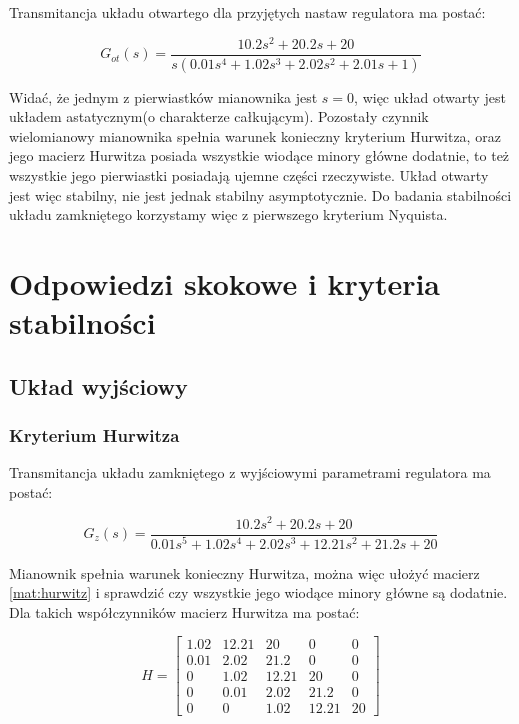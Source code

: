 \documentclass[12pt]{article}
\begin{document}
Transmitancja układu otwartego dla przyjętych nastaw regulatora ma postać:

\begin{equation}
	G_{ot}(s)=\frac{10.2s^2+20.2s+20}{s(0.01s^4+1.02s^3+2.02s^2+2.01s+1)}
\end{equation}

Widać, że jednym z pierwiastków mianownika jest $s=0$, więc układ otwarty jest
układem astatycznym(o charakterze całkującym). Pozostały czynnik wielomianowy
mianownika spełnia warunek konieczny kryterium Hurwitza, oraz jego macierz
Hurwitza posiada wszystkie wiodące minory główne dodatnie, to też wszystkie jego
pierwiastki posiadają ujemne części rzeczywiste. Układ otwarty jest więc
stabilny, nie jest jednak stabilny asymptotycznie. Do badania
stabilności układu zamkniętego korzystamy więc z pierwszego kryterium Nyquista.








\newpage

\section{Odpowiedzi skokowe i kryteria stabilności}

\subsection{Układ wyjściowy}

\subsubsection{Kryterium Hurwitza}

Transmitancja układu zamkniętego z wyjściowymi parametrami regulatora ma postać:

\begin{equation}
	G_{z}(s)=\frac{10.2s^2+20.2s+20}{0.01s^5+1.02s^4+2.02s^3+12.21s^2+21.2s+20}
\end{equation}

Mianownik spełnia warunek konieczny Hurwitza, można więc ułożyć macierz
\eqref{mat:hurwitz} i sprawdzić czy wszystkie jego wiodące minory główne są
dodatnie. Dla takich współczynników macierz Hurwitza ma postać:

\begin{equation}
	H=
	\begin{bmatrix}
		 	1.02  	& 	12.21 	&  	20 		&      0        	& 0	\\
    		0.01  	&  	2.02  	& 	21.2	&      0        	& 0	\\
    	    0    	&	1.02  	& 	12.21  	& 		20  		& 0	\\
         	0    	&	0.01  	&  	2.02   	&		21.2  		& 0	\\
         	0       &  	0    	&	1.02   	&		12.21  		& 20
	\end{bmatrix}
\end{equation}
\end{document}
